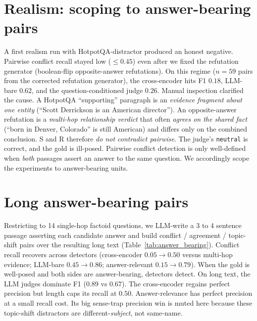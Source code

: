 \documentclass[sigconf, nonacm, natbib]{acmart}
\begin{document}
\section{Realism: scoping to answer-bearing pairs}
\label{sec:realism}
A first realism run with HotpotQA-distractor produced an honest negative. Pairwise
conflict recall stayed low ($\le 0.45$) even after we fixed the refutation generator
(boolean-flip opposite-answer refutations). On this regime ($n=59$ pairs from the
corrected refutation generator), the cross-encoder hits F1 $0.18$, LLM-bare $0.62$,
and the question-conditioned judge $0.26$. Manual inspection clarified the cause. A
HotpotQA ``supporting'' paragraph is an \emph{evidence fragment about one entity}
(``Scott Derrickson is an American director''). An opposite-answer refutation is a
\emph{multi-hop relationship verdict} that often \emph{agrees on the shared fact}
(``born in Denver, Colorado'' is still American) and differs only on the combined
conclusion. S and R therefore \emph{do not contradict pairwise}. The judge's
\texttt{neutral} is correct, and the gold is ill-posed. Pairwise conflict detection is
only well-defined when \emph{both} passages assert an answer to the same question. We
accordingly scope the experiments to answer-bearing units.

\section{Long answer-bearing pairs}
\label{sec:answerbearing}
Restricting to 14 single-hop factoid questions, we LLM-write a 3 to 4 sentence passage
asserting each candidate answer and build conflict / agreement / topic-shift pairs over
the resulting long text (Table~\ref{tab:answer_bearing}). Conflict recall recovers
across detectors (cross-encoder $0.05 \to 0.50$ versus multi-hop evidence; LLM-bare
$0.45 \to 0.86$; answer-relevant $0.15 \to 0.79$). When the gold is well-posed and
both sides are answer-bearing, detectors detect. On long text, the LLM judges dominate
F1 ($0.89$ vs $0.67$). The cross-encoder regains perfect precision but length caps its
recall at $0.50$. Answer-relevance has perfect precision at a small recall cost. Its
big sense-trap precision win is muted here because these topic-shift distractors are
different-\emph{subject}, not same-name.


\end{document}
